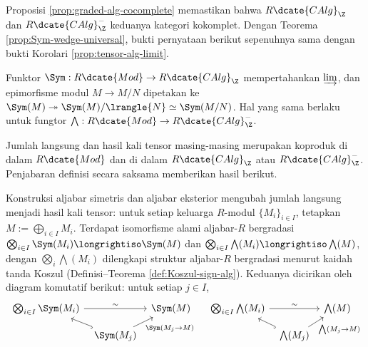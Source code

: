 Proposisi \ref{prop:graded-alg-cocomplete} memastikan bahwa $R\dcate{CAlg}_\Z$ dan $R\dcate{CAlg}^-_\Z$ keduanya kategori kokomplet. Dengan Teorema \ref{prop:Sym-wedge-universal}, bukti pernyataan berikut sepenuhnya sama dengan bukti Korolari \ref{prop:tensor-alg-limit}.
\begin{corollary}\label{prop:Sym-wedge-rightexact}
	Funktor $\Sym: R\dcate{Mod} \to R\dcate{CAlg}_\Z$ mempertahankan $\varinjlim$, dan epimorfisme modul $M \to M/N$ dipetakan ke $\Sym(M) \twoheadrightarrow \Sym(M)/\lrangle{N} \simeq \Sym(M/N)$. Hal yang sama berlaku untuk fungtor $\bigwedge: R\dcate{Mod} \to R\dcate{CAlg}^-_\Z$.
\end{corollary}

Jumlah langsung dan hasil kali tensor masing-masing merupakan koproduk di dalam $R\dcate{Mod}$ dan di dalam $R\dcate{CAlg}_\Z$ atau $R\dcate{CAlg}^-_\Z$. Penjabaran definisi secara saksama memberikan hasil berikut.
\begin{corollary}\label{prop:Sym-wedge-direct-sum}
	Konstruksi aljabar simetris dan aljabar eksterior mengubah jumlah langsung menjadi hasil kali tensor: untuk setiap keluarga $R$-modul $\{M_i\}_{i \in I}$, tetapkan $M := \bigoplus_{i \in I} M_i$. Terdapat isomorfisme alami aljabar-$R$ bergradasi $\bigotimes_{i \in I} \Sym(M_i) \longrightiso \Sym(M)$ dan $\bigotimes_{i \in I} \bigwedge(M_i) \longrightiso \bigwedge(M)$, dengan $\bigotimes_i \bigwedge(M_i)$ dilengkapi struktur aljabar-$R$ bergradasi menurut kaidah tanda Koszul (Definisi--Teorema \ref{def:Koszul-sign-alg}). Keduanya dicirikan oleh diagram komutatif berikut: untuk setiap $j \in I$,
	\[\begin{tikzcd}[column sep=tiny, row sep=small]
		\bigotimes_{i \in I} \Sym(M_i) \arrow[rr, "\sim"] & & \Sym(M) \\
		& \Sym(M_j) \arrow[hookrightarrow, lu] \arrow[ru, "{\Sym(M_j \to M)}"'] &
	\end{tikzcd}\quad\begin{tikzcd}[column sep=tiny, row sep=small]
		\bigotimes_{i \in I} \bigwedge(M_i) \arrow[rr, "\sim"] & & \bigwedge(M) \\
		& \bigwedge(M_j) \arrow[hookrightarrow, lu] \arrow[ru, "{\bigwedge (M_j \to M)}"'] &
	\end{tikzcd}\]
\end{corollary}

